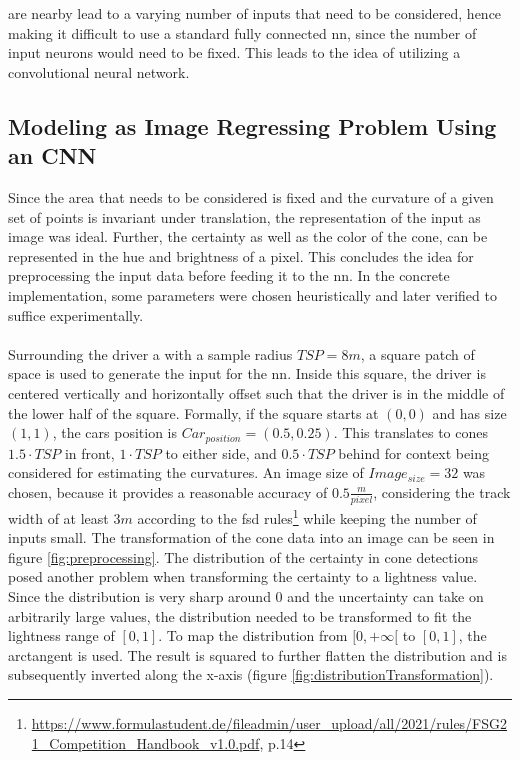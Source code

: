 are nearby lead to a varying number of inputs that need to be considered, hence making it difficult to use a standard fully connected \ac{nn}, since the number of input neurons would need to be fixed. This leads to the idea of utilizing a convolutional neural network.
\subsection{Modeling as Image Regressing Problem Using an CNN}
Since the area that needs to be considered is fixed and the curvature of a given set of points is invariant under translation, the representation of the input as image was ideal. Further, the certainty as well as the color of the cone, can be represented in the hue and brightness of a pixel. This concludes the idea for preprocessing the input data before feeding it to the \ac{nn}. In the concrete implementation, some parameters were chosen heuristically and later verified to suffice experimentally.\\
\\
Surrounding the driver a with a sample radius $TSP = 8 m$, a square patch of space is used to generate the input for the \ac{nn}. Inside this square, the driver is centered vertically and horizontally offset such that the driver is in the middle of the lower half of the square. Formally, if the square starts at $(0,0)$ and has size $(1,1)$, the cars position is $Car_{position}=(0.5,0.25)$. This translates to cones $1.5\cdot TSP$ in front, $1\cdot TSP$ to either side, and $0.5\cdot TSP$ behind for context being considered for estimating the curvatures. An image size of $Image_{size}=32$ was chosen, because it provides a reasonable accuracy of $0.5 \frac{m}{pixel}$, considering the track width of at least $3 m$ according to the \ac{fsd} rules\footnote{\url{https://www.formulastudent.de/fileadmin/user_upload/all/2021/rules/FSG21_Competition_Handbook_v1.0.pdf}, p.14} while keeping the number of inputs small. The transformation of the cone data into an image can be seen in figure \ref{fig:preprocessing}. The distribution of the certainty in cone detections posed another problem when transforming the certainty to a lightness value. Since the distribution is very sharp around 0 and the uncertainty can take on arbitrarily large values, the distribution needed to be transformed to fit the lightness range of $[0,1]$. To map the distribution from $[0,+\infty[$ to $[0,1]$, the arctangent is used. The result is squared to further flatten the distribution and is subsequently inverted along the x-axis (figure \ref{fig:distributionTransformation}). 
